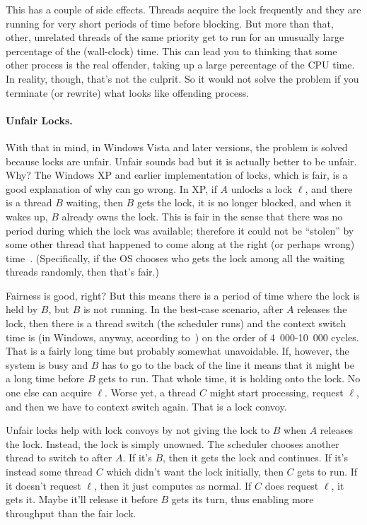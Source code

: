 \documentclass[a4paper]{report}
\begin{document}
This has a couple of side effects. Threads acquire the lock frequently and they are running for very short periods of time before blocking. But more than that, other, unrelated threads of the same priority get to run for an unusually large percentage of the (wall-clock) time. This can lead you to thinking that some other process is the real offender, taking up a large percentage of the CPU time. In reality, though, that's not the culprit. So it would not solve the problem if you terminate (or rewrite) what looks like offending process. 

\paragraph{Unfair Locks.} With that in mind, in Windows Vista and later versions, the problem is solved because locks are unfair. Unfair sounds bad but it is actually better to be unfair. Why? The Windows XP and earlier implementation of locks, which is fair, is a good explanation of why can go wrong. In XP, if $A$ unlocks a lock $\ell$, and there is a thread $B$ waiting, then $B$ gets the lock, it is no longer blocked, and when it wakes up, $B$ already owns the lock. This is fair in the sense that there was no period during which the lock was available; therefore it could not be ``stolen'' by some other thread that happened to come along at the right (or perhaps wrong) time~\cite{anticonvoy}. (Specifically, if the OS chooses who gets the lock among all the waiting threads randomly, then that's fair.)

Fairness is good, right? But this means there is a period of time where the lock is held by $B$, but $B$ is not running. In the best-case scenario, after $A$ releases the lock, then there is a thread switch (the scheduler runs) and the context switch time is (in Windows, anyway, according to~\cite{anticonvoy}) on the order of 4~000-10~000 cycles. That is a fairly long time but probably somewhat unavoidable. If, however, the system is busy and $B$ has to go to the back of the line it means that it might be a long time before $B$ gets to run. That whole time, it is holding onto the lock. No one else can acquire $\ell$. Worse yet, a thread $C$ might start processing, request $\ell$, and then we have to context switch again. That is a lock convoy.

Unfair locks help with lock convoys by not giving the lock to $B$ when $A$ releases the lock. Instead, the lock is simply unowned. The scheduler chooses another thread to switch to after $A$. If it's $B$, then it gets the lock and continues. If it's instead some thread $C$ which didn't want the lock initially, then $C$ gets to run. If it doesn't request $\ell$, then it just computes as normal. If $C$ does request $\ell$, it gets it. Maybe it'll release it before $B$ gets its turn, thus enabling more throughput than the fair lock.
\end{document}
